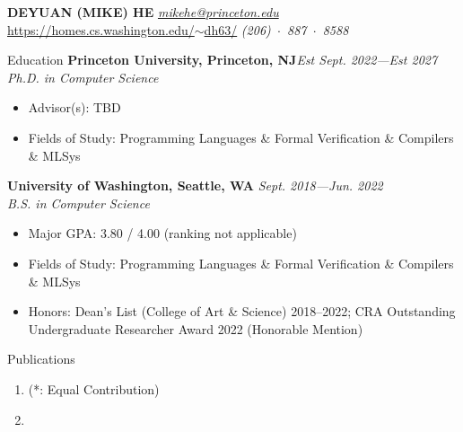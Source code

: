 \documentclass{resume}
\begin{document}
\vspace{-0.5in}

	\MakeUppercase{\Large{\textbf{Deyuan (Mike) He}}} \hfill {\em{\href{mailto:mikehe@princeton.edu}{mikehe@princeton.edu}}}\\
	\vspace{-5pt}\href{https://homes.cs.washington.edu/~dh63/}{https://homes.cs.washington.edu/$\sim$dh63/} \hfill{\em (206)~$\cdot$~887~$\cdot$~8588}

	\begin{rSection}{Education}
    {\bf Princeton University, Princeton, NJ}\hfill {\em Est Sept. 2022---Est 2027} \\
    \textit{Ph.D. in Computer Science}
    \vspace{-5pt}
    \begin{itemize}[leftmargin=*]
        \setlength{\itemsep}{1pt}
        \setlength{\parskip}{0pt}
        \setlength{\parsep}{0pt}
        \item Advisor(s): TBD
        \item Fields of Study: Programming Languages \& Formal Verification \& Compilers \& MLSys
    \end{itemize}
	{\bf University of Washington, Seattle, WA} \hfill {\em Sept. 2018---Jun. 2022} \\
	\textit{B.S. in Computer Science}
	\vspace{-5pt}
        \begin{itemize}[leftmargin=*]
            \setlength{\itemsep}{1pt}
            \setlength{\parskip}{0pt}
			\setlength{\parsep}{0pt}
			\item Major GPA: 3.80 / 4.00 (ranking not applicable)
            \item Fields of Study: Programming Languages \& Formal Verification \& Compilers \& MLSys
            \item Honors: Dean's List (College of Art \& Science) 2018--2022; CRA Outstanding Undergraduate Researcher Award 2022 (Honorable Mention)
		\end{itemize}
	\end{rSection}
	\vspace{-5pt}
    \begin{rSection}{Publications}
		\begin{enumerate}
			\setlength{\itemsep}{1pt}
            \setlength{\parskip}{0pt}
			\setlength{\parsep}{0pt}
			\item {} (\small{*: Equal Contribution})
			\item {}
		\end{enumerate}
        \vspace{-5pt}
	\end{rSection}
\end{document}
